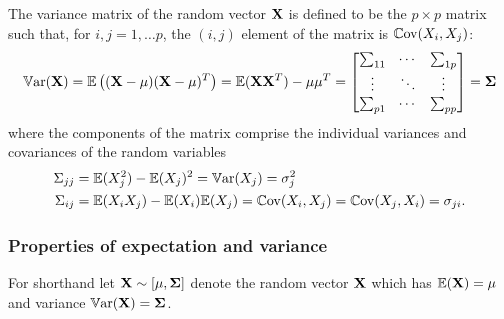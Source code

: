 \documentclass[10pt, a4paper]{article}
\begin{document}
\begin{definition}
    The variance matrix of the random vector $\mathbf{X}$ is defined to be the $p \times p$ matrix such that,
    for $i, j = 1, \dotsc p$,
    the $(i, j)$ element of the matrix is $\mathbb{C}\mathrm{ov}(X_i, X_j)$:
    \[
    \mathbb{V}\mathrm{ar}(\mathbf{X}) = \mathbb{E}\left((\mathbf{X} - \mathbf{\mu})(\mathbf{X} - \mathbf{\mu}) ^ T\right) = \mathbb{E}(\mathbf{X}\mathbf{X} ^ T) - \mathbf{\mu}\mathbf{\mu} ^ T = \begin{bmatrix}
        \sum_{11} & \dotsi & \sum_{1p} \\
        \vdots & \ddots & \vdots \\
        \sum_{p1} & \dotsi & \sum_{pp}
    \end{bmatrix} = \mathbf{\Sigma}
    \]
    where the components of the matrix comprise the individual variances and covariances of the random variables
    \begin{align*}
        \Sigma_{jj} &= \mathbb{E}(X_j ^ 2) - \mathbb{E}(X_j) ^ 2 = \mathbb{V}\mathrm{ar}(X_j) = \sigma_j ^ 2 \\
        \Sigma_{ij} &= \mathbb{E}(X_iX_j) - \mathbb{E}(X_i)\mathbb{E}(X_j) = \mathbb{C}\mathrm{ov}(X_i, X_j) = \mathbb{C}\mathrm{ov}(X_j, X_i) = \sigma_{ji}.
    \end{align*}
\end{definition}

\subsubsection{Properties of expectation and variance}
For shorthand let $\mathbf{X} \sim [\mathbf{\mu}, \mathbf{\Sigma}]$ denote the random vector $\mathbf{X}$ which has $\mathbb{E}(\mathbf{X}) = \mathbf{\mu}$ and variance $\mathbb{V}\mathrm{ar}(\mathbf{X}) = \mathbf{\Sigma}$.
\end{document}
